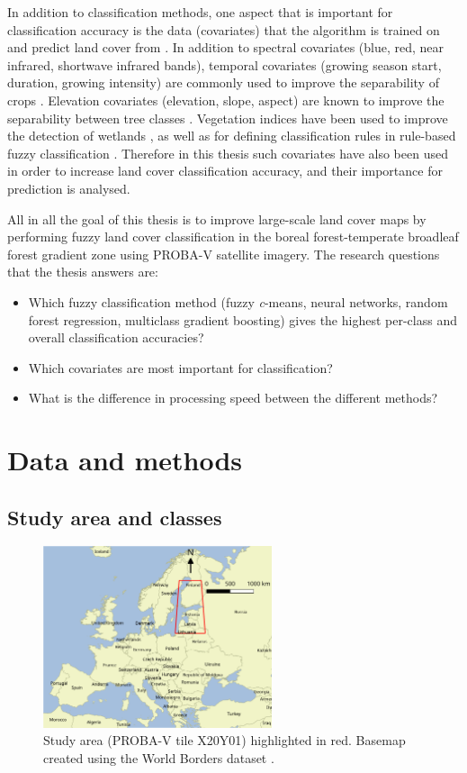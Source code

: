\documentclass[a4paper,12pt]{scrbook}
\begin{document}
In addition to classification methods, one aspect that is important for classification accuracy is the data (covariates) that the algorithm is trained on and predict land cover from \citep{yu2014metadiscoveries}. In addition to spectral covariates (blue, red, near infrared, shortwave infrared bands), temporal covariates (growing season start, duration, growing intensity) are commonly used to improve the separability of crops \citep{jakubauskas2001harmonic}. Elevation covariates (elevation, slope, aspect) are known to improve the separability between tree classes \citep{burrough2001fuzzy}. Vegetation indices have been used to improve the detection of wetlands \citep{sader1995wetlands}, as well as for defining classification rules in rule-based fuzzy classification \citep{baraldi2006rulebased}. Therefore in this thesis such covariates have also been used in order to increase land cover classification accuracy, and their importance for prediction is analysed.

All in all the goal of this thesis is to improve large-scale land cover maps by performing fuzzy land cover classification in the boreal forest-temperate broadleaf forest gradient zone using PROBA-V satellite imagery. The research questions that the thesis answers are:

\begin{itemize}
 \item Which fuzzy classification method (fuzzy \textit{c}-means, neural networks, random forest regression, multiclass gradient boosting) gives the highest per-class and overall classification accuracies?
 \item Which covariates are most important for classification?
 \item What is the difference in processing speed between the different methods?
\end{itemize}

\chapter{Data and methods}

\section{Study area and classes}

\begin{figure}
 \centering
 \includegraphics[width=0.6\textwidth]{./thesis-figures/aoi}
 \caption{Study area (PROBA-V tile X20Y01) highlighted in red. Basemap created using the World Borders dataset \citep{worldborders}.}
 \label{AOI}
\end{figure} 
\end{document}
